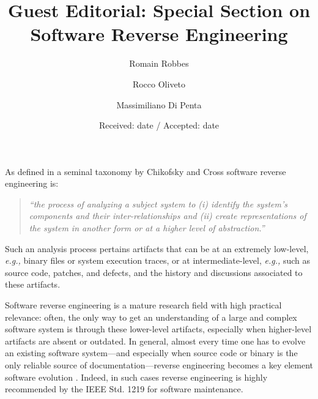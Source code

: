 \documentclass{svjour3}                     %
\newcommand{\eg}{\textit{e.g.,}\xspace}
\begin{document}
\title{Guest Editorial: Special Section on Software Reverse Engineering}

\author{Romain Robbes \and  Rocco Oliveto \and Massimiliano Di Penta}
\date{Received: date / Accepted: date}


\maketitle

As defined in a seminal taxonomy by Chikofsky and Cross \citep{DBLP:journals/software/ChikofskyC90} software reverse engineering is:

\begin{quote}
 {\em ``the process of analyzing a subject system to (i) identify the system’s components and their inter-relationships and (ii) create representations of the system in another form or at a higher level of abstraction.''}
\end{quote}

Such an analysis process pertains artifacts that can be at an extremely low-level, \eg binary files or system execution traces, or at intermediate-level, \eg such as source code, patches, and defects, and the history and discussions associated to these artifacts. 

Software reverse engineering is a mature research field with high practical relevance: often, the only way to get an understanding of a large and complex software system is through these lower-level artifacts, especially when higher-level artifacts are absent or outdated. In general, almost every time one has to evolve an existing software system---and especially when source code or binary is the only reliable source of documentation---reverse engineering becomes a key element software evolution \citep{DBLP:conf/icse/CanforaP07}. Indeed, in such cases reverse engineering is highly recommended by the IEEE Std. 1219 \citep{IEEE1999-Std1219} for software maintenance. 
\end{document}
